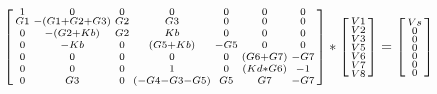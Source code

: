 \(
\begin{bsmallmatrix}
1  & 0  & 0  & 0  & 0  & 0  & 0\\
G1  & -(G1 + G2 + G3)  & G2  & G3  & 0  & 0  & 0\\
0  & -(G2 + Kb)  & G2  & Kb  & 0  & 0  & 0\\
0  & -Kb  & 0  & (G5 + Kb)  & -G5  & 0  & 0\\
0  & 0  & 0  & 0  & 0  & (G6 + G7)  & -G7\\
0  & 0  & 0  & 1  & 0  & (Kd * G6)  & -1\\
0  & G3  & 0  & (-G4 - G3 - G5)  & G5  & G7  & -G7
\end{bsmallmatrix}
*
\begin{bsmallmatrix}
V1\\
V2\\
V3\\
V5\\
V6\\
V7\\
V8
\end{bsmallmatrix}
=
\begin{bsmallmatrix}
Vs\\
0\\
0\\
0\\
0\\
0\\
0
\end{bsmallmatrix}
\)

\vspace{20pt}

